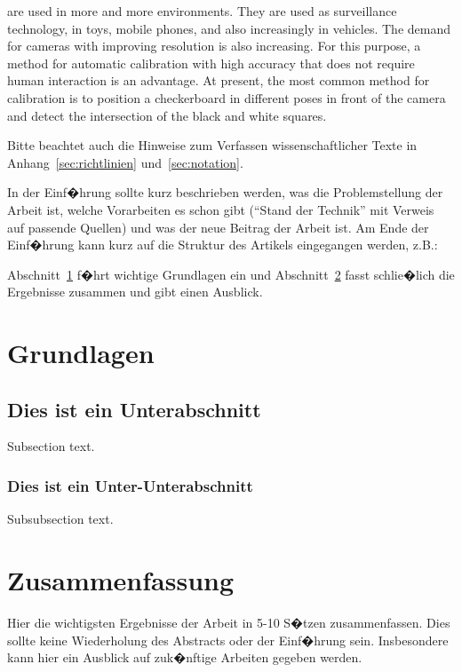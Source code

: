 \documentclass[journal,final,a4paper,twoside]{PS}
\begin{document}
 are used in more and more environments. They are used as surveillance technology, in toys, mobile phones, and also increasingly in vehicles. 
The demand for cameras with improving resolution is also increasing. For this purpose, a method for automatic calibration with high accuracy that does not require human interaction is an advantage. At present, the most common method for calibration is to position a checkerboard in different poses in front of the camera and detect the intersection of the black and white squares. 



Bitte beachtet auch die Hinweise zum Verfassen wissenschaftlicher Texte in Anhang~\ref{sec:richtlinien} und~\ref{sec:notation}.

In der Einf�hrung sollte kurz beschrieben werden, was die Problemstellung der Arbeit ist, welche Vorarbeiten es schon gibt (``Stand der Technik'' mit Verweis auf passende Quellen) und was der neue Beitrag der Arbeit ist. Am Ende der Einf�hrung kann kurz auf die Struktur des Artikels eingegangen werden, z.B.: 

Abschnitt~\ref{sec:grundlangen} f�hrt wichtige Grundlagen ein und Abschnitt~\ref{sec:zus} fasst schlie�lich die Ergebnisse zusammen und gibt einen Ausblick.

\section{Grundlagen}
\label{sec:grundlangen}

\subsection{Dies ist ein Unterabschnitt}
Subsection text.
\subsubsection{Dies ist ein Unter-Unterabschnitt}
Subsubsection text.




\section{Zusammenfassung}
\label{sec:zus}
Hier die wichtigsten Ergebnisse der Arbeit in 5-10 S�tzen zusammenfassen. Dies sollte keine Wiederholung des Abstracts oder der Einf�hrung sein. Insbesondere kann hier ein Ausblick auf zuk�nftige Arbeiten gegeben werden.


\appendices
\end{document}
